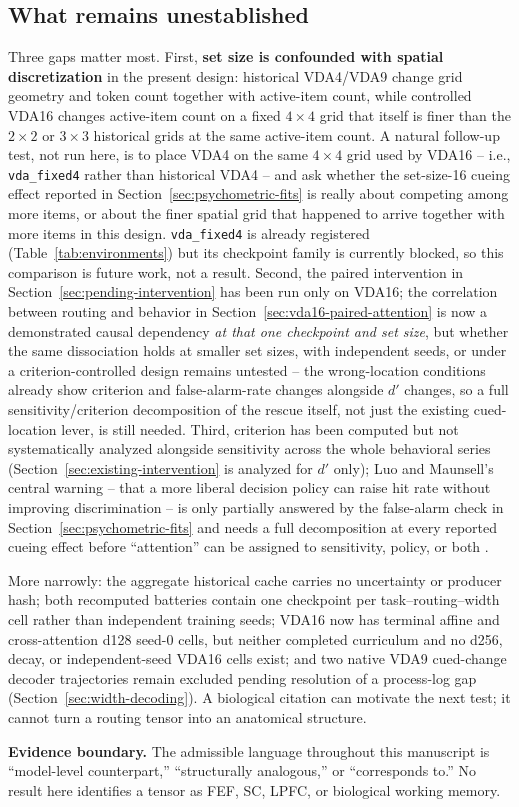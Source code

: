 \documentclass[11pt,a4paper]{article}
\newcommand{\boundary}[1]{\par\smallskip\noindent\colorbox{VdaLight}{\parbox{0.96\linewidth}{\textbf{Evidence boundary.} #1}}\par\smallskip}
\newcommand{\env}[1]{\texttt{#1}}
\begin{document}
\subsection{What remains unestablished}
Three gaps matter most. First, \textbf{set size is confounded with spatial discretization} in the present design: historical VDA4/VDA9 change grid geometry and token count together with active-item count, while controlled VDA16 changes active-item count on a fixed $4\times4$ grid that itself is finer than the $2\times2$ or $3\times3$ historical grids at the same active-item count. A natural follow-up test, not run here, is to place VDA4 on the same $4\times4$ grid used by VDA16 -- i.e., \env{vda\_fixed4} rather than historical VDA4 -- and ask whether the set-size-16 cueing effect reported in Section~\ref{sec:psychometric-fits} is really about competing among more items, or about the finer spatial grid that happened to arrive together with more items in this design. \env{vda\_fixed4} is already registered (Table~\ref{tab:environments}) but its checkpoint family is currently blocked, so this comparison is future work, not a result. Second, the paired intervention in Section~\ref{sec:pending-intervention} has been run only on VDA16; the correlation between routing and behavior in Section~\ref{sec:vda16-paired-attention} is now a demonstrated causal dependency \emph{at that one checkpoint and set size}, but whether the same dissociation holds at smaller set sizes, with independent seeds, or under a criterion-controlled design remains untested -- the wrong-location conditions already show criterion and false-alarm-rate changes alongside $d'$ changes, so a full sensitivity/criterion decomposition of the rescue itself, not just the existing cued-location lever, is still needed. Third, criterion has been computed but not systematically analyzed alongside sensitivity across the whole behavioral series (Section~\ref{sec:existing-intervention} is analyzed for $d'$ only); Luo and Maunsell's central warning -- that a more liberal decision policy can raise hit rate without improving discrimination -- is only partially answered by the false-alarm check in Section~\ref{sec:psychometric-fits} and needs a full decomposition at every reported cueing effect before ``attention'' can be assigned to sensitivity, policy, or both \cite{luo2018}.

More narrowly: the aggregate historical cache carries no uncertainty or producer hash; both recomputed batteries contain one checkpoint per task--routing--width cell rather than independent training seeds; VDA16 now has terminal affine and cross-attention d128 seed-0 cells, but neither completed curriculum and no d256, decay, or independent-seed VDA16 cells exist; and two native VDA9 cued-change decoder trajectories remain excluded pending resolution of a process-log gap (Section~\ref{sec:width-decoding}). A biological citation can motivate the next test; it cannot turn a routing tensor into an anatomical structure. \boundary{The admissible language throughout this manuscript is ``model-level counterpart,'' ``structurally analogous,'' or ``corresponds to.'' No result here identifies a tensor as FEF, SC, LPFC, or biological working memory.}
\end{document}
